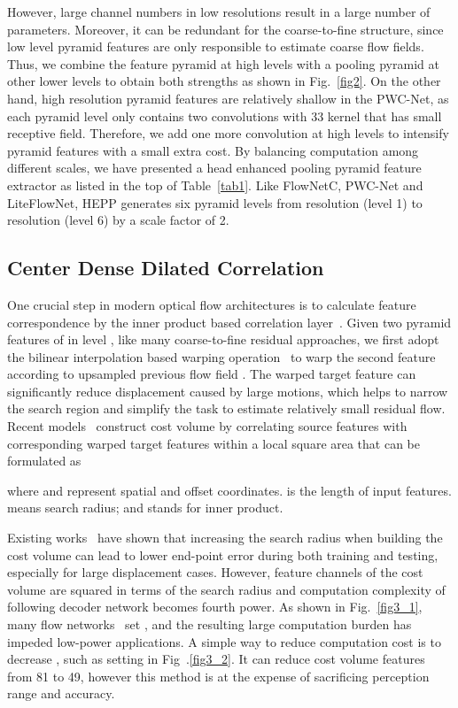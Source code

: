 \documentclass[letterpaper, 10 pt, conference]{ieeeconf}
\begin{document}
However, large channel numbers in low resolutions result in a large number of 
parameters. Moreover, it can be redundant for the coarse-to-fine structure, since low level pyramid features are only responsible to estimate coarse flow fields. Thus, we combine the feature pyramid at  high levels with a pooling pyramid at other lower  levels to obtain both strengths as shown in Fig.~\ref{fig2}. On the other hand, high resolution pyramid features are  relatively shallow in the PWC-Net, as each pyramid level only contains two convolutions with 33 kernel that has small receptive field. Therefore,  we add one more convolution at 
high levels to intensify pyramid features  with a small extra cost. By balancing computation among different scales, we have presented a head enhanced pooling pyramid feature extractor as listed in the top of Table~\ref{tab1}. Like FlowNetC, PWC-Net and LiteFlowNet, HEPP generates six pyramid levels from   resolution (level 1) to  resolution (level 6) by a scale factor of 2.






\subsection{Center Dense Dilated Correlation}
One crucial step in modern optical flow architectures is to calculate feature correspondence by the inner product based correlation layer~\cite{Fischer_2015}. Given two pyramid features of  in level , like many coarse-to-fine residual approaches, we first adopt the bilinear interpolation based warping operation~\cite{Ranjan_2017, Ilg_2017} to warp the second feature  according to  upsampled previous flow field . The warped target feature  can significantly reduce displacement caused by large motions, which 
helps to narrow the search region and simplify the task to estimate relatively small residual flow. Recent models~\cite{Sun_2018_CVPR}\cite{Hui_2018_CVPR} construct cost volume by correlating source features with corresponding warped target features within a local square area that can be formulated as

where  and  represent spatial and offset coordinates.  is the length of input features.  means search radius; and  stands for inner product.



Existing works~\cite{Sun_2018_CVPR, hofinger2019improving} have shown that increasing the search radius when building the cost volume can lead to lower end-point error during both training and testing, especially for large displacement cases. However, feature channels of the cost volume are squared in terms of the 
search radius and computation complexity of following decoder network becomes 
fourth power. As shown in Fig.~\ref{fig3_1}, many flow networks~\cite{Sun_2018_CVPR,Kong_2020,Hur_2019,Yin_2019} set , and the resulting large computation burden has impeded low-power applications. A simple 
way to reduce computation cost is to decrease , such as setting  in Fig~.\ref{fig3_2}. It can reduce cost volume features from 81 to 49, however this method is at the expense of sacrificing perception range and accuracy.
\end{document}
